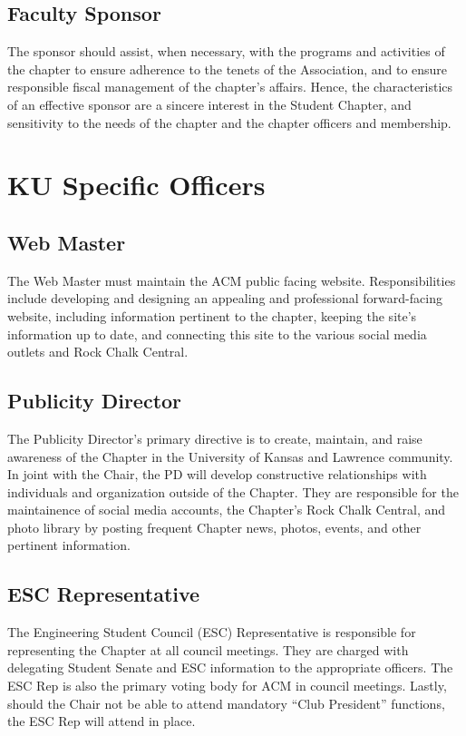 \subsection*{Faculty Sponsor}
The sponsor should assist, when necessary, with the programs and activities of the chapter to ensure adherence to the tenets of the Association, and to ensure responsible fiscal management of the chapter's affairs. Hence, the characteristics of an effective sponsor are a sincere interest in the Student Chapter, and sensitivity to the needs of the chapter and the chapter officers and membership.
\section*{KU Specific Officers}
\subsection*{Web Master}
The Web Master must maintain the ACM public facing website. Responsibilities
include developing and designing an appealing and professional forward-facing website, including information pertinent to the chapter, keeping the site’s information up to date, and connecting this site to the various social media outlets and Rock Chalk Central.
\subsection*{Publicity Director}
The Publicity Director's primary directive is to create, maintain, and raise awareness of the Chapter in the University of Kansas and Lawrence community. In joint with the Chair, the PD will develop constructive relationships with individuals and organization outside of the Chapter. They are responsible for the maintainence of social media accounts, the Chapter's Rock Chalk Central, and photo library by posting frequent Chapter news, photos, events, and other pertinent information.
\subsection*{ESC Representative}
The Engineering Student Council (ESC) Representative is responsible for representing the Chapter at all council meetings. They are charged with delegating Student Senate and ESC information to the appropriate officers.  The ESC Rep is also the primary voting body for ACM in council meetings. Lastly, should the Chair not be able to attend mandatory “Club President” functions, the ESC Rep will attend in place.

